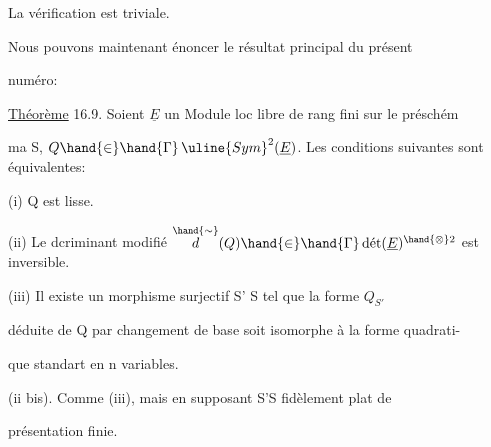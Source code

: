 La vérification est triviale.

Nous pouvons maintenant énoncer le résultat principal du présent

numéro:

\uline{Théorème} 16.9. Soient $\underline{E}$ un Module loc libre de rang fini sur le préschém

ma S, $Q \hand{\in}\hand{\Gamma}\,\uline{Sym}^2(\underline{E})$. Les conditions suivantes sont équivalentes:

(i) Q est lisse.

(ii) Le dcriminant modifié $\overset{\hand{\sim}}{d}(Q) \hand{\in}\hand{\Gamma}\,\text{dét}(\underline{E})^{\hand{\otimes}2}$ est inversible.

(iii)  Il existe un morphisme surjectif S' \quad S tel que la forme $Q_{S'}$

déduite de Q par changement de base soit isomorphe à la forme quadrati-%

que standart en n variables.

(ii bis). Comme (iii), mais en supposant S'\hand{$\rightarrow$}S fidèlement plat de

présentation finie.


